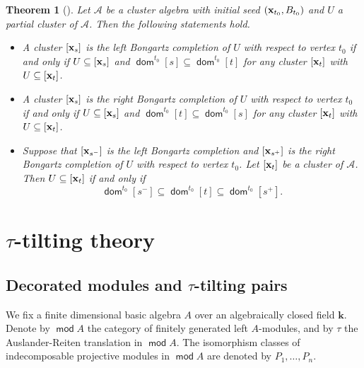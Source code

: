 \documentclass[10pt]{amsart}
\newtheorem{theorem}{Theorem}[section]
\theoremstyle{definition}
\theoremstyle{remark}
\numberwithin{equation}{section}
\def\mod{\opname{mod}\nolimits}
\newcommand{\opname}[1]{\operatorname{\mathsf{#1}}}
\newcommand{\dom}{\opname{dom}}
\begin{document}
\begin{theorem}[\cite{cao-2026a}]
\label{thm:dom-set}
Let $\mathcal A$ be a cluster algebra with initial seed $({\bf x}_{t_0}, B_{t_0})$ and $U$ a partial cluster of $\mathcal A$. Then the following statements hold.
\begin{itemize}
    \item [(i)]    
    A cluster $[{\bf x}_s]$ is the left Bongartz completion of $U$ with respect to vertex $t_0$ if and only if $U\subseteq [{\bf x}_s]$ and  $\dom^{t_0}[s]\subseteq \dom^{t_0}[t]$ for any cluster $[{\bf x}_t]$ with $U\subseteq [{\bf x}_t]$.
    
   \item [(ii)]  A cluster $[{\bf x}_s]$ is the right Bongartz completion of $U$ with respect to vertex $t_0$ if and only if $U\subseteq [{\bf x}_s]$ and $\dom^{t_0}[t]\subseteq \dom^{t_0}[s]$ for any cluster $[{\bf x}_t]$ with $U\subseteq [{\bf x}_t]$. 
   \item[(iii)] Suppose that $[{\bf x}_{s^-}]$ is the left Bongartz completion and $[{\bf x}_{s^+}]$ is the right Bongartz completion of $U$ with respect to vertex $t_0$. Let $[{\bf x}_t]$ be a cluster of $\mathcal A$. Then $U\subseteq [{\bf x}_t]$ if and only if 
   \[ \dom^{t_0}[s^-]\subseteq \dom^{t_0}[t]\subseteq \dom^{t_0}[s^+].\]
\end{itemize}
\end{theorem}



\section{$\tau$-tilting theory}
\subsection{Decorated modules and $\tau$-tilting pairs}
 We fix a finite dimensional basic algebra $A$ over an algebraically closed field $\mathbf{k}$.  Denote by $\mod A$ the category of finitely generated left $A$-modules, and by $\tau$ the Auslander-Reiten translation in $\mod A$.  The  isomorphism classes of indecomposable projective modules in $\mod A$ are denoted by $P_1,\ldots,P_n$.
\end{document}

